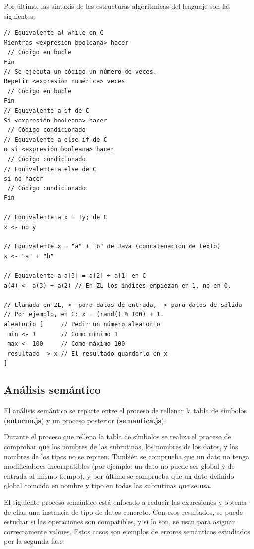 \documentclass{report}
\begin{document}
	Por último, las sintaxis de las estructuras algoritmicas del lenguaje son las siguientes:
	
	\begin{BVerbatim}
// Equivalente al while en C
Mientras <expresión booleana> hacer
 // Código en bucle
Fin
// Se ejecuta un código un número de veces. 
Repetir <expresión numérica> veces
 // Código en bucle
Fin
// Equivalente a if de C
Si <expresión booleana> hacer
 // Código condicionado
// Equivalente a else if de C
o si <expresión booleana> hacer
 // Código condicionado
// Equivalente a else de C
si no hacer
 // Código condicionado
Fin

// Equivalente a x = !y; de C
x <- no y

// Equivalente x = "a" + "b" de Java (concatenación de texto)
x <- "a" + "b"

// Equivalente a a[3] = a[2] + a[1] en C
a(4) <- a(3) + a(2) // En ZL los índices empiezan en 1, no en 0.

// Llamada en ZL, <- para datos de entrada, -> para datos de salida
// Por ejemplo, en C: x = (rand() % 100) + 1.
aleatorio [     // Pedir un número aleatorio
 min <- 1       // Como mínimo 1
 max <- 100     // Como máximo 100
 resultado -> x // El resultado guardarlo en x
]
	\end{BVerbatim}
	
	\subsection{Análisis semántico}
	
	El análisis semántico se reparte entre el proceso de rellenar la tabla de símbolos (\textbf{entorno.js}) y un proceso posterior (\textbf{semantica.js}). 
	
	\vspace{10px}
	
	Durante el proceso que rellena la tabla de símbolos se realiza el proceso de comprobar que los nombres de las subrutinas, los nombres de los datos, y los nombres de los tipos no se repiten. También se comprueba que un dato no tenga modificadores incompatibles (por ejemplo: un dato no puede ser global y de entrada al mismo tiempo), y por último se comprueba que un dato definido global coincida en nombre y tipo en todas las subrutinas que se usa.
	
	\vspace{10px}
	
	El siguiente proceso semántico está enfocado a reducir las expresiones y obtener de ellas una instancia de tipo de datos concreto. Con esos resultados, se puede estudiar si las operaciones son compatibles, y si lo son, se usan para asignar correctamente valores. Estos casos son ejemplos de errores semánticos estudiados por la segunda fase:
	
\end{document}
